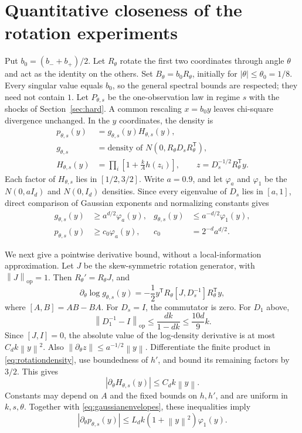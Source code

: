 \documentclass[11pt,a4paper]{article}
\numberwithin{equation}{section}
\newcommand{\T}{\mathsf T}
\newcommand{\op}{\mathrm{op}}
\newcommand{\norm}[1]{\left\lVert #1\right\rVert}
\begin{document}
\section{Quantitative closeness of the rotation experiments}\label{sec:closeness}
Put \(b_0=(b_-+b_+)/2\). Let \(R_\theta\) rotate the first two coordinates
through angle \(\theta\) and act as the identity on the others.
Set \(B_\theta=b_0R_\theta\), initially for
\(|\theta|\le\theta_0=1/8\). Every singular value equals \(b_0\), so the
general spectral bounds are respected; they need not contain \(1\).
Let \(P_{\theta,s}\) be the one-observation law in regime \(s\) with the
shocks of Section~\ref{sec:hard}.
A common rescaling \(x=b_0y\) leaves chi-square divergence unchanged.
In the \(y\) coordinates, the density is
\begin{equation}\label{eq:rotationdensity}
 \begin{aligned}
 p_{\theta,s}(y)&=g_{\theta,s}(y)H_{\theta,s}(y),\\
 g_{\theta,s}&=\text{density of }N(0,R_\theta D_sR_\theta^\T),\\
 H_{\theta,s}(y)&=\prod_i\left[1+\frac{k}{A}h(z_i)\right],
 \qquad z=D_s^{-1/2}R_\theta^\T y.
 \end{aligned}
\end{equation}
Each factor of \(H_{\theta,s}\) lies in \([1/2,3/2]\).
Write \(a=0.9\), and let \(\varphi_a\) and \(\varphi_1\) be the
\(N(0,aI_d)\) and \(N(0,I_d)\) densities.
Since every eigenvalue of \(D_s\) lies in \([a,1]\), direct comparison
of Gaussian exponents and normalizing constants gives
\begin{equation}\label{eq:gaussianenvelopes}
 \begin{aligned}
 g_{\theta,s}(y)&\ge a^{d/2}\varphi_a(y),&
 g_{\theta,s}(y)&\le a^{-d/2}\varphi_1(y),\\
 p_{\theta,s}(y)&\ge c_0\varphi_a(y),&
 c_0&=2^{-d}a^{d/2}.
 \end{aligned}
\end{equation}

We next give a pointwise derivative bound, without a local-information
approximation. Let \(J\) be the skew-symmetric rotation generator,
with \(\norm J_{\op}=1\). Then \(R_\theta'=R_\theta J\), and
\[
 \partial_\theta\log g_{\theta,s}(y)
 =-\frac12y^\T R_\theta[J,D_s^{-1}]R_\theta^\T y,
\]
where \([A,B]=AB-BA\).
For \(D_s=I\), the commutator is zero. For \(D_1\) above,
\[
 \norm{D_1^{-1}-I}_{\op}
 \le\frac{dk}{1-dk}\le\frac{10d}{9}k.
\]
Since \([J,I]=0\), the absolute value of the log-density derivative is
at most \(C_dk\norm y^2\).
Also \(\norm{\partial_\theta z}\le a^{-1/2}\norm y\).
Differentiate the finite product in \eqref{eq:rotationdensity}, use
boundedness of \(h'\), and bound its remaining factors by \(3/2\).
This gives
\[
 |\partial_\theta H_{\theta,s}(y)|\le C_dk\norm y.
\]
Constants may depend on \(A\) and the fixed bounds on \(h,h'\), and are
uniform in \(k,s,\theta\).
Together with \eqref{eq:gaussianenvelopes}, these inequalities imply
\begin{equation}\label{eq:densityderivative}
 |\partial_\theta p_{\theta,s}(y)|
 \le L_dk(1+\norm y^2)\varphi_1(y).
\end{equation}
\end{document}
